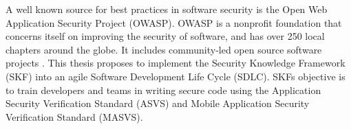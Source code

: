 A well known source for best practices in software security is the Open Web Application Security Project (OWASP). OWASP is a nonprofit foundation that concerns itself on improving the security of software, and has over 250 local chapters around the globe. It includes community-led open source software projects \cite{owasp_about}. This thesis proposes to implement the Security Knowledge Framework (SKF) into an agile Software Development Life Cycle (SDLC). SKFs objective is to train developers and teams in writing secure code using the Application Security Verification Standard (ASVS) and Mobile Application Security Verification Standard (MASVS).



